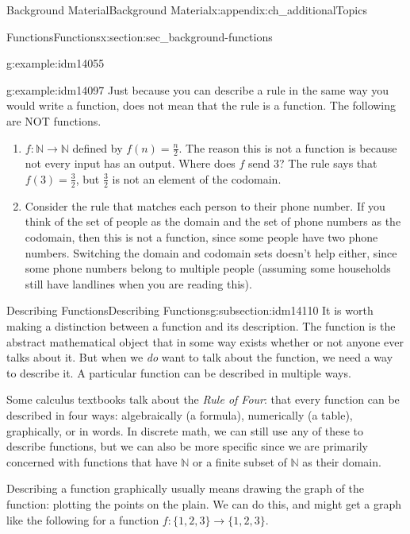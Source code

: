 \documentclass[oneside,10pt,]{book}
\numberwithin{equation}{chapter}
\def\N{\mathbb N}
\begin{document}
\begin{appendixptx}{Background Material}{}{Background Material}{}{}{x:appendix:ch_additionalTopics}
\begin{sectionptx}{Functions}{}{Functions}{}{}{x:section:sec_background-functions}
\begin{introduction}{}
\begin{example}{}{g:example:idm14055}
\begin{enumerate}
\end{enumerate}
%
\end{example}
\begin{example}{}{g:example:idm14097}%
Just because you can describe a rule in the same way you would write a function, does not mean that the rule is a function.  The following are NOT functions.%
\begin{enumerate}
\item{}\(f:\N \to \N\) defined by \(f(n) = \frac{n}{2}\).  The reason this is not a function is because not every input has an output.  Where does \(f\) send 3?  The rule says that \(f(3) = \frac{3}{2}\), but \(\frac{3}{2}\) is not an element of the codomain.%
\item{}Consider the rule that matches each person to their phone number.  If you think of the set of people as the domain and the set of phone numbers as the codomain, then this is not a function, since some people have two phone numbers.  Switching the domain and codomain sets doesn't help either, since some phone numbers belong to multiple people (assuming some households still have landlines when you are reading this).%
\end{enumerate}
%
\end{example}
\end{introduction}%
%
%
\typeout{************************************************}
\typeout{************************************************}
%
\begin{subsectionptx}{Describing Functions}{}{Describing Functions}{}{}{g:subsection:idm14110}
It is worth making a distinction between a function and its description.  The function is the abstract mathematical object that in some way exists whether or not anyone ever talks about it.  But when we \emph{do} want to talk about the function, we need a way to describe it.  A particular function can be described in multiple ways.%
\par
Some calculus textbooks talk about the \emph{Rule of Four}: that every function can be described in four ways: algebraically (a formula), numerically (a table), graphically, or in words.  In discrete math, we can still use any of these to describe functions, but we can also be more specific since we are primarily concerned with functions that have \(\N\) or a finite subset of \(\N\) as their domain.%
\par
Describing a function graphically usually means drawing the graph of the function: plotting the points on the plain. We can do this, and might get a graph like the following for a function \(f:\{1,2,3\} \to \{1,2,3\}\).%

\end{subsectionptx}
\end{sectionptx}
\end{appendixptx}
\end{document}
